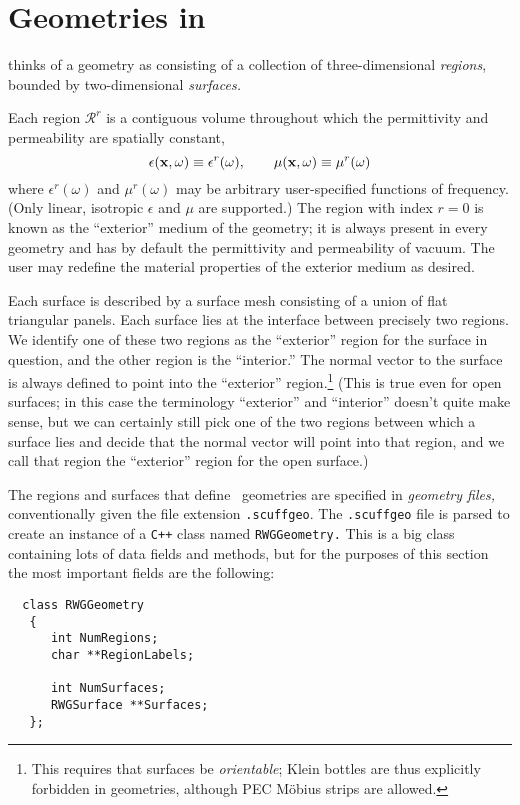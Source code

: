 \newpage
\section{Geometries in \lss}
\label{GeometriesSection}

\lss thinks of a geometry as consisting of a collection
of three-dimensional \textit{regions}, bounded by 
two-dimensional \textit{surfaces.}

Each region $\mathcal{R}^r$ is a contiguous volume
throughout which the permittivity and permeability are 
spatially constant,
$$ \epsilon(\mathbf{x}, \omega) \equiv \epsilon^r(\omega), \qquad
   \mu(\mathbf{x}, \omega)      \equiv \mu^r(\omega)
$$
where $\epsilon^r(\omega)$ and $\mu^r(\omega)$ may
be arbitrary user-specified functions of frequency. 
(Only linear, isotropic $\epsilon$ and $\mu$ are supported.)
The region with index $r=0$ is known as the 
``exterior'' medium of the \lss geometry; it is 
always present in every \lss geometry and has by 
default the permittivity and permeability of vacuum. 
The user may redefine the material properties of the 
exterior medium as desired.

Each surface is described by a surface mesh consisting of 
a union of flat triangular panels. 
Each surface lies at the interface between precisely two 
regions. We identify one of these two regions as 
the ``exterior'' region for the surface in question,
and the other region is the ``interior.'' The normal 
vector to the surface is always defined to point into 
the ``exterior'' region.\footnote{This requires that 
surfaces be \textit{orientable}; Klein bottles are thus 
explicitly forbidden in \lss geometries, although PEC 
M\"obius strips are allowed.} (This is true even for 
open surfaces; in this case the terminology ``exterior'' 
and ``interior'' doesn't quite make sense, but we can 
certainly still pick one of the two regions between
which a surface lies and decide that the normal vector
will point into that region, and we call that region
the ``exterior'' region for the open surface.)

The regions and surfaces that define \lss\, geometries are 
specified in \textit{geometry files,} conventionally given the 
file extension \texttt{.scuffgeo}. The \texttt{.scuffgeo}
file is parsed to create an instance of a \texttt{C++} 
class named \texttt{RWGGeometry.} This is a big class 
containing lots of data fields and methods, but 
for the purposes of this section the most important 
fields are the following:
%
\begin{verbatim}
  class RWGGeometry
   {
      int NumRegions;
      char **RegionLabels;

      int NumSurfaces;
      RWGSurface **Surfaces;
   };
\end{verbatim}
%
